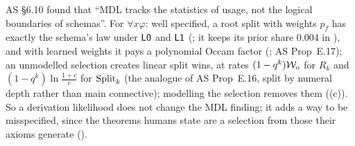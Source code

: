 \begin{remark}\label{rem:univ:mdl}
AS \S6.10 found that ``MDL tracks the statistics of usage, not the logical boundaries of schemas''. For $\forall x\varphi$: well specified, a root split with weights $p_f$ has exactly the schema's law under $\mathord{\mathsf{L0}}$ and $\mathord{\mathsf{L1}}$ (; it keeps its prior share $0.004$ in ), and with learned weights it pays a polynomial Occam factor (; AS Prop~E.17); an unmodelled selection creates linear split wins, at rates $(1-q^k)\mathcal{W}_{\mathrm{o}}$ for $R_k$ and $(1-q^k)\ln\frac{1+c}c$ for $\mathrm{Split}_k$ (the analogue of AS Prop~E.16, split by numeral depth rather than main connective); modelling the selection removes them ((c)). So a derivation likelihood does not change the MDL finding; it adds a way to be misspecified, since the theorems humans state are a selection from those their axioms generate ().
\end{remark}

